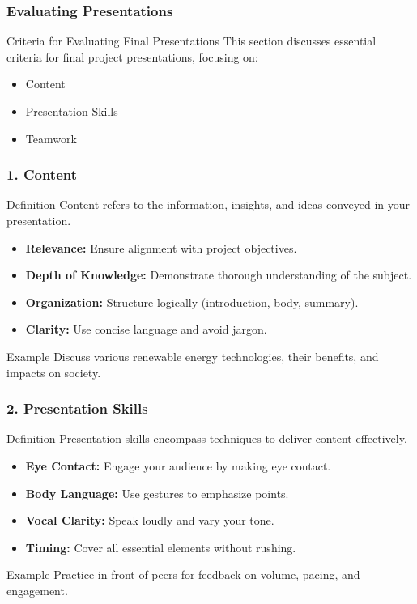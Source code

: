 \documentclass[aspectratio=169]{beamer}
\begin{document}
\begin{frame}[fragile]
    \frametitle{Evaluating Presentations}
    \begin{block}{Criteria for Evaluating Final Presentations}
        This section discusses essential criteria for final project presentations, focusing on:
        \begin{itemize}
            \item Content
            \item Presentation Skills
            \item Teamwork
        \end{itemize}
    \end{block}
\end{frame}

\begin{frame}[fragile]
    \frametitle{1. Content}
    \begin{block}{Definition}
        Content refers to the information, insights, and ideas conveyed in your presentation.
    \end{block}
    \begin{itemize}
        \item \textbf{Relevance:} Ensure alignment with project objectives.
        \item \textbf{Depth of Knowledge:} Demonstrate thorough understanding of the subject.
        \item \textbf{Organization:} Structure logically (introduction, body, summary).
        \item \textbf{Clarity:} Use concise language and avoid jargon.
    \end{itemize}
    \begin{block}{Example}
        Discuss various renewable energy technologies, their benefits, and impacts on society.
    \end{block}
\end{frame}

\begin{frame}[fragile]
    \frametitle{2. Presentation Skills}
    \begin{block}{Definition}
        Presentation skills encompass techniques to deliver content effectively.
    \end{block}
    \begin{itemize}
        \item \textbf{Eye Contact:} Engage your audience by making eye contact.
        \item \textbf{Body Language:} Use gestures to emphasize points.
        \item \textbf{Vocal Clarity:} Speak loudly and vary your tone.
        \item \textbf{Timing:} Cover all essential elements without rushing.
    \end{itemize}
    \begin{block}{Example}
        Practice in front of peers for feedback on volume, pacing, and engagement.
    \end{block}
\end{frame}
\end{document}
